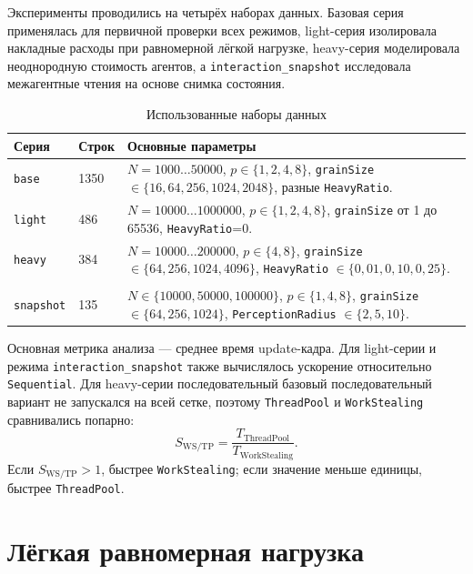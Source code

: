 \documentclass[14pt,a4paper,oneside]{extreport}
\begin{document}
Эксперименты проводились на четырёх наборах данных. Базовая серия применялась для первичной проверки всех режимов, light-серия изолировала накладные расходы при равномерной лёгкой нагрузке, heavy-серия моделировала неоднородную стоимость агентов, а \texttt{interaction\_snapshot} исследовала межагентные чтения на основе снимка состояния.

\begin{table}[ht]
\centering
\small
\caption{Использованные наборы данных}
\label{tab:datasets}
\begin{tabularx}{\textwidth}{|p{}|p{}|X|}
\hline
Серия & Строк & Основные параметры \\
\hline
\texttt{base} & 1350 & \(N=1000\ldots50000\), \(p \in \{1,2,4,8\}\), \texttt{grainSize} \( \in \{16,64,256,1024,2048\}\), разные \texttt{HeavyRatio}. \\
\hline
\texttt{light} & 486 & \(N=10000\ldots1000000\), \(p \in \{1,2,4,8\}\), \texttt{grainSize} от 1 до 65536, \texttt{HeavyRatio}=0. \\
\hline
\texttt{heavy} & 384 & \(N=10000\ldots200000\), \(p \in \{4,8\}\), \texttt{grainSize} \( \in \{64,256,1024,4096\}\), \texttt{HeavyRatio} \( \in \{0{,}01,0{,}10,0{,}25\}\). \\
\hline
\makecell{\texttt{interaction}\\\texttt{snapshot}} & 135 & \(N \in \{10000,50000,100000\}\), \(p \in \{1,4,8\}\), \texttt{grainSize} \( \in \{64,256,1024\}\), \texttt{PerceptionRadius} \( \in \{2,5,10\}\). \\
\hline
\end{tabularx}
\end{table}

Основная метрика анализа --- среднее время update-кадра. Для light-серии и режима \texttt{interaction\_snapshot} также вычислялось ускорение относительно \texttt{Sequential}. Для heavy-серии последовательный базовый последовательный вариант не запускался на всей сетке, поэтому \texttt{ThreadPool} и \texttt{WorkStealing} сравнивались попарно:
\begin{equation}
S_{\mathrm{WS/TP}} =
\frac{T_{\mathrm{ThreadPool}}}{T_{\mathrm{WorkStealing}}}.
\label{eq:ws-tp}
\end{equation}
Если \(S_{\mathrm{WS/TP}} > 1\), быстрее \texttt{WorkStealing}; если значение меньше единицы, быстрее \texttt{ThreadPool}.

\section{Лёгкая равномерная нагрузка}
\end{document}
